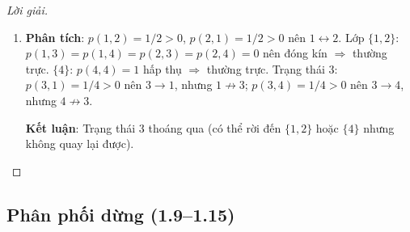 \documentclass[8pt,a4paper]{article}
\newenvironment{solution}{\begin{proof}[Lời giải]}{\end{proof}}
\begin{document}
\begin{solution}
\begin{enumerate}[label=(\alph*)]
\textbf{Kết luận}: $\{1,3\}$ đóng kín $\Rightarrow$ thường trực. Trạng thái 2: $2\to 3$ nhưng $3\not\to 2$, nên 2 thoáng qua.

\item \textbf{Phân tích}: $p(1,2)=1/2>0$, $p(2,1)=1/2>0$ nên $1\leftrightarrow 2$. Lớp $\{1,2\}$: $p(1,3)=p(1,4)=p(2,3)=p(2,4)=0$ nên đóng kín $\Rightarrow$ thường trực. $\{4\}$: $p(4,4)=1$ hấp thụ $\Rightarrow$ thường trực. Trạng thái 3: $p(3,1)=1/4>0$ nên $3\to 1$, nhưng $1\not\to 3$; $p(3,4)=1/4>0$ nên $3\to 4$, nhưng $4\not\to 3$.

\textbf{Kết luận}: Trạng thái 3 thoáng qua (có thể rời đến $\{1,2\}$ hoặc $\{4\}$ nhưng không quay lại được).
\end{enumerate}
\end{solution}

\subsection*{Phân phối dừng (1.9--1.15)}
\end{document}
